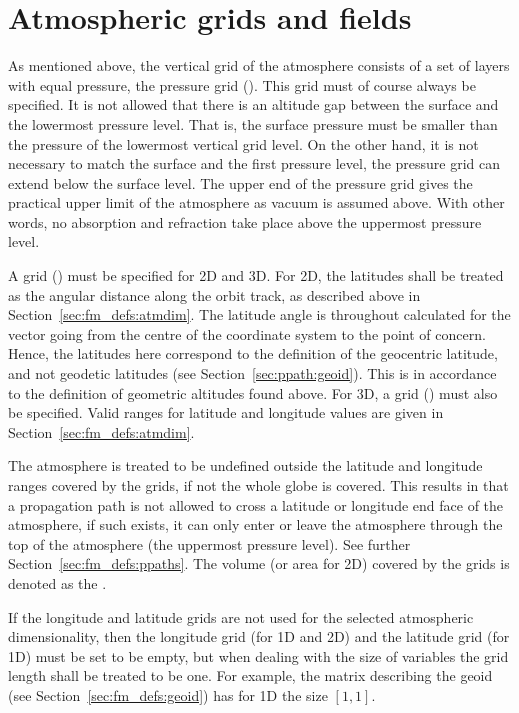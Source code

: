 


\section{Atmospheric grids and fields}
\label{sec:fm_defs:grids}

As mentioned above, the vertical grid of the atmosphere consists of a
set of layers with equal pressure, the pressure grid
().  This grid must of course always be specified.
It is not allowed that there is an altitude gap between the surface and
the lowermost pressure level.  That is, the surface pressure must be
smaller than the pressure of the lowermost vertical grid level. On
the other hand, it is not necessary to match the surface and the first
pressure level, the pressure grid can extend below the surface level.
The upper end of the pressure grid gives the practical upper limit of
the atmosphere as vacuum is assumed above. With other words, no
absorption and refraction take place above the uppermost pressure
level.

A  grid () must be specified
for 2D and 3D.  For 2D, the latitudes shall be treated as the angular
distance along the orbit track, as described above in
Section~\ref{sec:fm_defs:atmdim}.  The latitude angle is throughout
calculated for the vector going from the centre of the coordinate
system to the point of concern. Hence, the latitudes here correspond
to the definition of the geocentric latitude, and not geodetic
latitudes (see Section~\ref{sec:ppath:geoid}). This is in accordance
to the definition of geometric altitudes found above.  For 3D, a
 grid () must also be specified.
Valid ranges for latitude and longitude values are given in
Section~\ref{sec:fm_defs:atmdim}.

The atmosphere is treated to be undefined outside the latitude and
longitude ranges covered by the grids, if not the whole globe is
covered. This results in that a propagation path is not allowed to
cross a latitude or longitude end face of the atmosphere, if such
exists, it can only enter or leave the atmosphere through the top of
the atmosphere (the uppermost pressure level). See further
Section~\ref{sec:fm_defs:ppaths}. The volume (or area for 2D) covered
by the grids is denoted as the .

If the longitude and latitude grids are not used for the selected
atmospheric dimensionality, then the longitude grid (for 1D and 2D)
and the latitude grid (for 1D) must be set to be empty, but when
dealing with the size of variables the grid length shall be treated to
be one. For example, the matrix describing the geoid (see
Section~\ref{sec:fm_defs:geoid}) has for 1D the size $[1,1]$.

